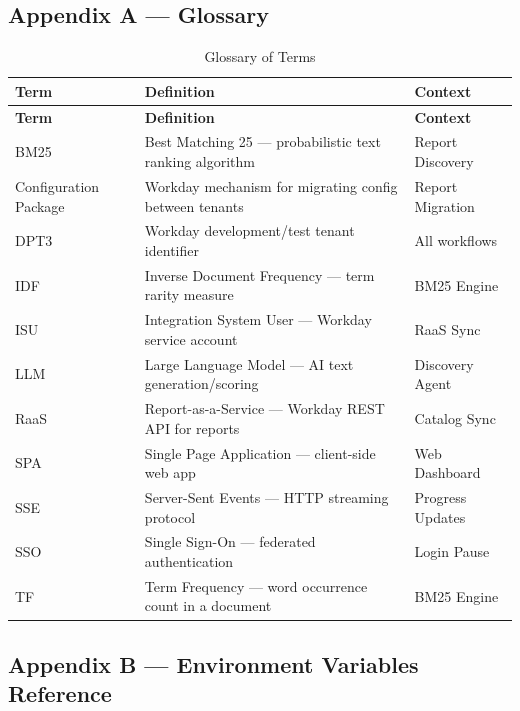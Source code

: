 \documentclass[12pt,a4paper]{article}
\begin{document}
\subsection{Appendix A --- Glossary}
\label{subsec:glossary}

\begin{longtable}{p{3.5cm} p{5cm} p{5cm}}
\caption{Glossary of Terms} \label{tab:glossary} \\
\toprule
\textbf{Term} & \textbf{Definition} & \textbf{Context} \\
\midrule
\endfirsthead
\toprule
\textbf{Term} & \textbf{Definition} & \textbf{Context} \\
\midrule
\endhead
BM25 & Best Matching 25 --- probabilistic text ranking algorithm & Report Discovery \\
\midrule
Configuration Package & Workday mechanism for migrating config between tenants & Report Migration \\
\midrule
DPT3 & Workday development/test tenant identifier & All workflows \\
\midrule
IDF & Inverse Document Frequency --- term rarity measure & BM25 Engine \\
\midrule
ISU & Integration System User --- Workday service account & RaaS Sync \\
\midrule
LLM & Large Language Model --- AI text generation/scoring & Discovery Agent \\
\midrule
RaaS & Report-as-a-Service --- Workday REST API for reports & Catalog Sync \\
\midrule
SPA & Single Page Application --- client-side web app & Web Dashboard \\
\midrule
SSE & Server-Sent Events --- HTTP streaming protocol & Progress Updates \\
\midrule
SSO & Single Sign-On --- federated authentication & Login Pause \\
\midrule
TF & Term Frequency --- word occurrence count in a document & BM25 Engine \\
\bottomrule
\end{longtable}

\subsection{Appendix B --- Environment Variables Reference}
\label{subsec:env-reference}
\end{document}
